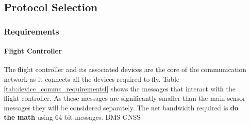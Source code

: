 \subsection{Protocol Selection}
\subsubsection{Requirements}
    \paragraph{Flight Controller}
    The flight controller and its associated devices are the core of the communication network as it connects all the devices required to fly. Table \ref{tab:device_comms_requirementsl} shows the messages that interact with the flight controller. As these messages are significantly smaller than the main sensor messages they will be considered separately. The net bandwidth required is \textbf{do the math} using 64 bit messages.
    \gls{BMS}
    \gls{GNSS}
